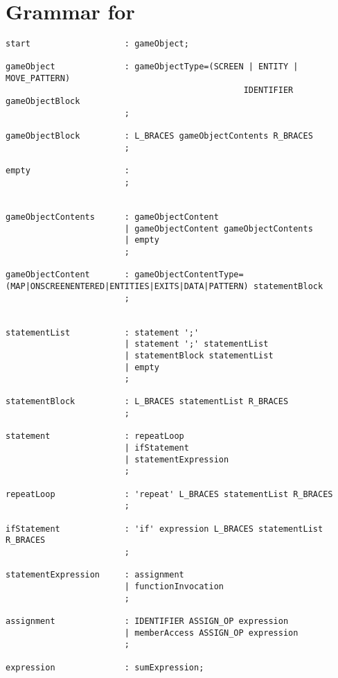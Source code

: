 \section{Grammar for \dazel}\label{app:DazelGrammar}

\begin{lstlisting}[language=CSharp, caption={The grammar for \dazel}, label={lst:DazelGrammar},escapechar=~]
start                   : gameObject;

gameObject              : gameObjectType=(SCREEN | ENTITY | MOVE_PATTERN) 
                                                IDENTIFIER gameObjectBlock
                        ;
                        
gameObjectBlock         : L_BRACES gameObjectContents R_BRACES
                        ;

empty                   : 
                        ;


gameObjectContents      : gameObjectContent
                        | gameObjectContent gameObjectContents
                        | empty
                        ;

gameObjectContent       : gameObjectContentType=(MAP|ONSCREENENTERED|ENTITIES|EXITS|DATA|PATTERN) statementBlock 
                        ;
                       

statementList           : statement ';'
                        | statement ';' statementList
                        | statementBlock statementList
                        | empty
                        ;
                        
statementBlock          : L_BRACES statementList R_BRACES
                        ;

statement               : repeatLoop
                        | ifStatement
                        | statementExpression
                        ;

repeatLoop              : 'repeat' L_BRACES statementList R_BRACES
                        ;

ifStatement             : 'if' expression L_BRACES statementList R_BRACES
                        ;

statementExpression     : assignment
                        | functionInvocation
                        ;

assignment              : IDENTIFIER ASSIGN_OP expression
                        | memberAccess ASSIGN_OP expression
                        ;

expression              : sumExpression;


\end{lstlisting}
